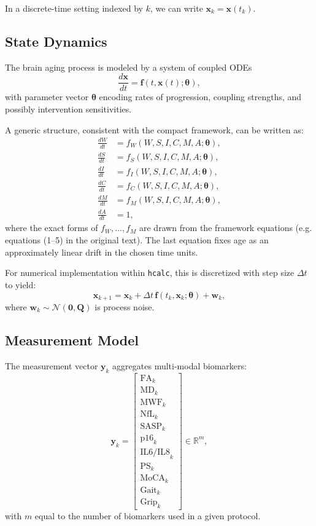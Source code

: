 \documentclass[11pt]{article}
\begin{document}
In a discrete-time setting indexed by \(k\), we can write \(\bm{x}_k = \bm{x}(t_k)\).

\subsection{State Dynamics}

The brain aging process is modeled by a system of coupled ODEs
\[
  \frac{d\bm{x}}{dt} = \bm{f}(t, \bm{x}(t); \bm{\theta}),
\]
with parameter vector \(\bm{\theta}\) encoding rates of progression, coupling strengths,
and possibly intervention sensitivities.

A generic structure, consistent with the compact framework, can be written as:
\begin{align*}
  \frac{dW}{dt} &= f_W(W, S, I, C, M, A; \bm{\theta}), \\
  \frac{dS}{dt} &= f_S(W, S, I, C, M, A; \bm{\theta}), \\
  \frac{dI}{dt} &= f_I(W, S, I, C, M, A; \bm{\theta}), \\
  \frac{dC}{dt} &= f_C(W, S, I, C, M, A; \bm{\theta}), \\
  \frac{dM}{dt} &= f_M(W, S, I, C, M, A; \bm{\theta}), \\
  \frac{dA}{dt} &= 1,
\end{align*}
where the exact forms of \(f_W, \dots, f_M\) are drawn from the framework equations
(e.g. equations (1--5) in the original text). The last equation fixes age as an
approximately linear drift in the chosen time units.

For numerical implementation within \texttt{hcalc}, this is discretized with step
size \(\Delta t\) to yield:
\[
  \bm{x}_{k+1} = \bm{x}_k + \Delta t \, \bm{f}(t_k, \bm{x}_k; \bm{\theta}) + \bm{w}_k,
\]
where \(\bm{w}_k \sim \mathcal{N}(\bm{0}, \bm{Q})\) is process noise.

\subsection{Measurement Model}

The measurement vector \(\bm{y}_k\) aggregates multi-modal biomarkers:
\[
  \bm{y}_k =
  \begin{bmatrix}
    \text{FA}_k \\
    \text{MD}_k \\
    \text{MWF}_k \\
    \text{NfL}_k \\
    \text{SASP}_k \\
    \text{p16}_k \\
    \text{IL6/IL8}_k \\
    \text{PS}_k \\
    \text{MoCA}_k \\
    \text{Gait}_k \\
    \text{Grip}_k
  \end{bmatrix}
  \in \mathbb{R}^{m},
\]
with \(m\) equal to the number of biomarkers used in a given protocol.
\end{document}
